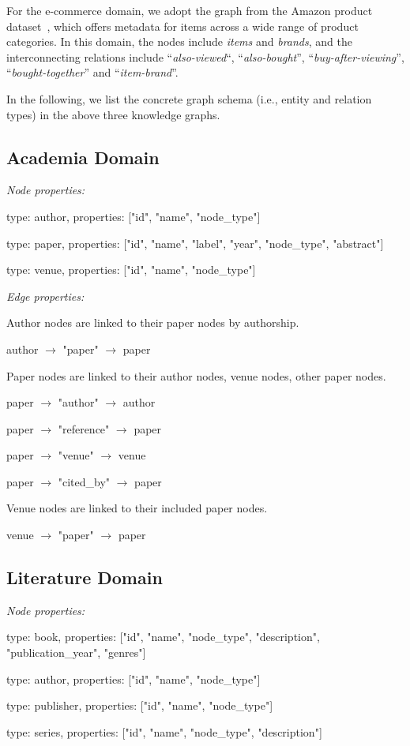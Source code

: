 For the e-commerce domain, we adopt the graph from the Amazon product dataset~\cite{e-commerce}, which offers metadata for items across a wide range of product categories. In this domain, the nodes include \textit{items} and \textit{brands}, and the interconnecting relations include ``\textit{also-viewed}``, ``\textit{also-bought}'', ``\textit{buy-after-viewing}'', ``\textit{bought-together}'' and ``\textit{item-brand}''.


In the following, we list the concrete graph schema (i.e., entity and relation types) in the above three knowledge graphs.

\subsection{Academia Domain}

\textit{Node properties:}
\squishlist
\item type: author, properties: ["id", "name", "node\_type"]
\item type: paper, properties: ["id", "name", "label", "year", "node\_type", "abstract"]
\item type: venue, properties: ["id", "name", "node\_type"]
\squishend

\textit{Edge properties:}

Author nodes are linked to their paper nodes by authorship.
\squishlist
\item author $\rightarrow$ "paper" $\rightarrow$ paper
\squishend

Paper nodes are linked to their author nodes, venue nodes, other paper nodes.
\squishlist
\item paper $\rightarrow$ "author" $\rightarrow$ author
\item paper $\rightarrow$ "reference" $\rightarrow$ paper
\item paper $\rightarrow$ "venue" $\rightarrow$ venue
\item paper $\rightarrow$ "cited\_by" $\rightarrow$ paper
\squishend

Venue nodes are linked to their included paper nodes.
\squishlist
\item venue $\rightarrow$ "paper" $\rightarrow$ paper
\squishend

\subsection{Literature Domain}

\textit{Node properties:}
\squishlist
\item type: book, properties: ["id", "name", "node\_type", "description", "publication\_year", "genres"]
\item type: author, properties: ["id", "name", "node\_type"]
\item type: publisher, properties: ["id", "name", "node\_type"]
\item type: series, properties: ["id", "name", "node\_type", "description"]
\squishend


